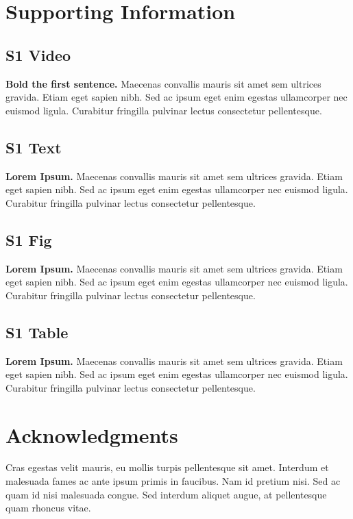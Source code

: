 \documentclass[10pt,letterpaper]{article}
\begin{document}
  
\section*{Supporting Information}

\subsection*{S1 Video}
\label{S1_Video}
{\bf Bold the first sentence.}  Maecenas convallis mauris sit amet sem ultrices gravida. Etiam eget sapien nibh. Sed ac ipsum eget enim egestas ullamcorper nec euismod ligula. Curabitur fringilla pulvinar lectus consectetur pellentesque.

\subsection*{S1 Text}
\label{S1_Text}
{\bf Lorem Ipsum.} Maecenas convallis mauris sit amet sem ultrices gravida. Etiam eget sapien nibh. Sed ac ipsum eget enim egestas ullamcorper nec euismod ligula. Curabitur fringilla pulvinar lectus consectetur pellentesque.

\subsection*{S1 Fig}
\label{S1_Fig}
{\bf Lorem Ipsum.} Maecenas convallis mauris sit amet sem ultrices gravida. Etiam eget sapien nibh. Sed ac ipsum eget enim egestas ullamcorper nec euismod ligula. Curabitur fringilla pulvinar lectus consectetur pellentesque.

\subsection*{S1 Table}
\label{S1_Table}
{\bf Lorem Ipsum.} Maecenas convallis mauris sit amet sem ultrices gravida. Etiam eget sapien nibh. Sed ac ipsum eget enim egestas ullamcorper nec euismod ligula. Curabitur fringilla pulvinar lectus consectetur pellentesque.

\section*{Acknowledgments}
Cras egestas velit mauris, eu mollis turpis pellentesque sit amet. Interdum et malesuada fames ac ante ipsum primis in faucibus. Nam id pretium nisi. Sed ac quam id nisi malesuada congue. Sed interdum aliquet augue, at pellentesque quam rhoncus vitae.

\nolinenumbers


{}
\end{document}
